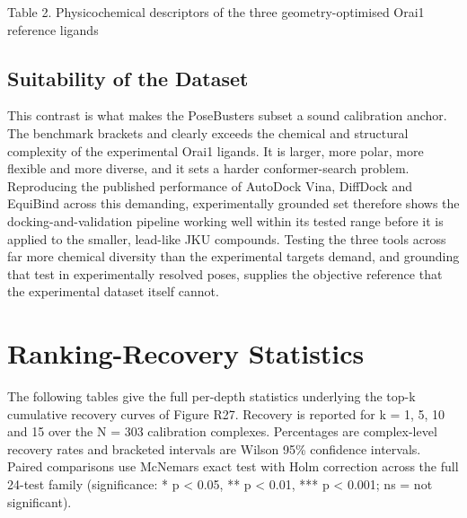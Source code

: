 Table 2. Physicochemical descriptors of the three geometry-optimised Orai1 reference ligands

\hypertarget{suitability-of-the-dataset}{%
\subsection{Suitability of the Dataset}\label{suitability-of-the-dataset}}

This contrast is what makes the PoseBusters subset a sound calibration anchor. The benchmark brackets and clearly exceeds the chemical and structural complexity of the experimental Orai1 ligands. It is larger, more polar, more flexible and more diverse, and it sets a harder conformer-search problem. Reproducing the published performance of AutoDock Vina, DiffDock and EquiBind across this demanding, experimentally grounded set therefore shows the docking-and-validation pipeline working well within its tested range before it is applied to the smaller, lead-like JKU compounds. Testing the three tools across far more chemical diversity than the experimental targets demand, and grounding that test in experimentally resolved poses, supplies the objective reference that the experimental dataset itself cannot.

\hypertarget{ranking-recovery-statistics}{%
\section{Ranking-Recovery Statistics}\label{ranking-recovery-statistics}}

The following tables give the full per-depth statistics underlying the top-k cumulative recovery curves of Figure R27. Recovery is reported for k = 1, 5, 10 and 15 over the N = 303 calibration complexes. Percentages are complex-level recovery rates and bracketed intervals are Wilson 95\% confidence intervals. Paired comparisons use McNemar\textquotesingle s exact test with Holm correction across the full 24-test family (significance: * p \textless{} 0.05, ** p \textless{} 0.01, *** p \textless{} 0.001; ns = not significant).

